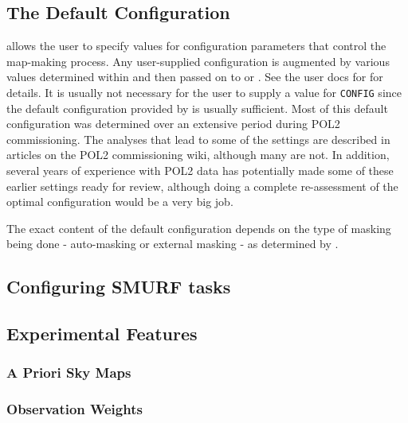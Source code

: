 \documentclass[twoside,11pt]{starlink}
\begin{document}
\subsection{The Default \ptmap Configuration}
 allows the user to specify values for configuration
parameters that control the map-making process. Any user-supplied
configuration is augmented by various values determined within \ptmap and
then passed on to \mmap or \sloop. See the user docs for  for
details. It is usually not necessary for the user to supply a value for
\texttt{CONFIG} since the default configuration provided by \ptmap
is usually sufficient. Most of this default configuration was determined over
an extensive period during POL2 commissioning. The analyses that lead to
some of the settings are described in articles on the POL2 commissioning
wiki, although many are not. In addition, several years of experience
with POL2 data has potentially made some of these earlier settings ready
for review, although doing a complete re-assessment of the optimal
configuration would be a very big job.

The exact content of the default configuration depends on the type of
masking being done - auto-masking or external masking - as determined by
.

\subsection{Configuring SMURF tasks}
\subsection{Experimental Features}
\subsubsection{A Priori Sky Maps}
\subsubsection{Observation Weights}
\end{document}
